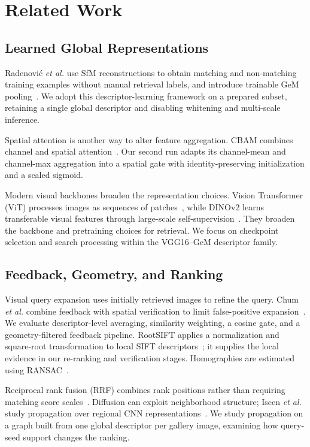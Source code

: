 \section{Related Work}
\subsection{Learned Global Representations}
Radenovi\'{c} \emph{et al.} use SfM reconstructions to obtain matching and non-matching training examples without manual retrieval labels, and introduce trainable GeM pooling~\cite{gem}. We adopt this descriptor-learning framework on a prepared subset, retaining a single global descriptor and disabling whitening and multi-scale inference.

Spatial attention is another way to alter feature aggregation. CBAM combines channel and spatial attention~\cite{cbam}. Our second run adapts its channel-mean and channel-max aggregation into a spatial gate with identity-preserving initialization and a scaled sigmoid.

Modern visual backbones broaden the representation choices. Vision Transformer (ViT) processes images as sequences of patches~\cite{vit}, while DINOv2 learns transferable visual features through large-scale self-supervision~\cite{dinov2}. They broaden the backbone and pretraining choices for retrieval. We focus on checkpoint selection and search processing within the VGG16--GeM descriptor family.

\subsection{Feedback, Geometry, and Ranking}
Visual query expansion uses initially retrieved images to refine the query. Chum \emph{et al.} combine feedback with spatial verification to limit false-positive expansion~\cite{totalrecall}. We evaluate descriptor-level averaging, similarity weighting, a cosine gate, and a geometry-filtered feedback pipeline. RootSIFT applies a normalization and square-root transformation to local SIFT descriptors~\cite{rootsift}; it supplies the local evidence in our re-ranking and verification stages. Homographies are estimated using RANSAC~\cite{ransac}.

Reciprocal rank fusion (RRF) combines rank positions rather than requiring matching score scales~\cite{rrf}. Diffusion can exploit neighborhood structure; Iscen \emph{et al.} study propagation over regional CNN representations~\cite{diffusion}. We study propagation on a graph built from one global descriptor per gallery image, examining how query-seed support changes the ranking.

